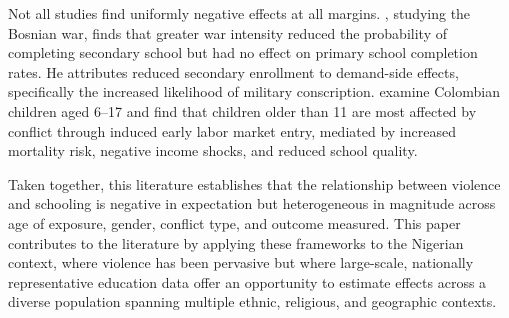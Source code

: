 Not all studies find uniformly negative effects at all margins. \citet{swee2009},
studying the Bosnian war, finds that greater war intensity reduced the
probability of completing secondary school but had no effect on primary
school completion rates. He attributes reduced secondary enrollment to
demand-side effects, specifically the increased likelihood of military
conscription. \citet{rodriguez2009} examine Colombian children aged 6--17
and find that children older than 11 are most affected by conflict through
induced early labor market entry, mediated by increased mortality risk,
negative income shocks, and reduced school quality.

Taken together, this literature establishes that the relationship between
violence and schooling is negative in expectation but heterogeneous in
magnitude across age of exposure, gender, conflict type, and outcome
measured. This paper contributes to the literature by applying these
frameworks to the Nigerian context, where violence has been pervasive but
where large-scale, nationally representative education data offer an
opportunity to estimate effects across a diverse population spanning multiple
ethnic, religious, and geographic contexts.

